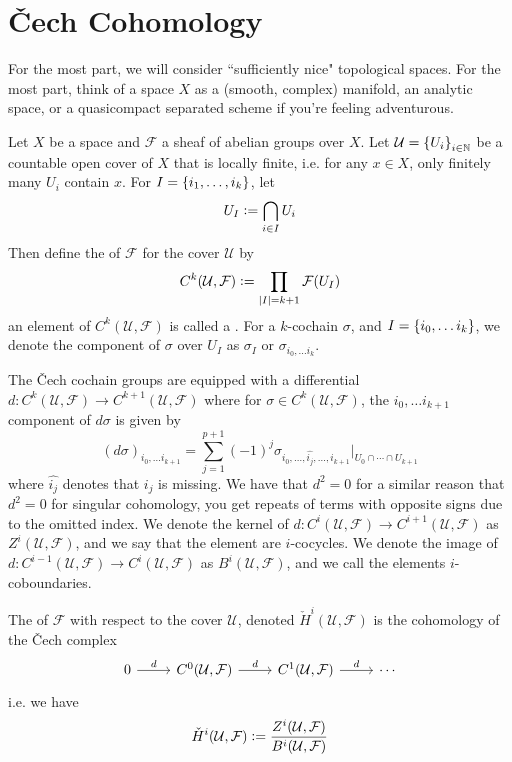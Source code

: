 \section{\v{C}ech Cohomology}
%
For the most part, we will consider ``sufficiently nice" topological spaces.
For the most part, think of a space $X$ as a (smooth, complex) manifold, an analytic
space, or a quasicompact separated scheme if you're feeling adventurous.
%
\begin{defn}
Let $X$ be a space and $\mathcal{F}$ a sheaf of abelian groups over $X$. Let
$\mathcal{U} = \left\lbrace U_i \right\rbrace_{i \in \mathbb{N}}$ be a countable open cover of $X$ that is locally
finite, i.e. for any $x \in X$, only finitely many $U_i$ contain $x$. For
$I = \left\lbrace i_1, \ldots, i_k \right\rbrace$, let
\[
U_I \vcentcolon= \bigcap_{i \in I} U_i
\]
Then define the  of $\mathcal{F}$ for the cover
$\mathcal{U}$ by
\begin{align*}
C^k(\mathcal{U}, \mathcal{F}) \vcentcolon= \prod_{|I| = k+1} \mathcal{F}(U_I)
\end{align*}
an element of $C^k(\mathcal{U},\mathcal{F})$ is called a .
For a $k$-cochain $\sigma$, and $I = \left\lbrace i_0,\ldots i_k \right\rbrace$, we denote the
component of $\sigma$ over $U_I$ as $\sigma_I$ or $\sigma_{i_0,\ldots i_k}$.
\end{defn}
%
The \v{C}ech cochain groups are equipped with a differential
$d : C^k(\mathcal{U}, \mathcal{F}) \to C^{k+1}(\mathcal{U}, \mathcal{F})$
where for $\sigma \in C^k(\mathcal{U}, \mathcal{F})$, the ${i_0, \ldots i_{k+1}}$
component of $d\sigma$ is given by
\[
(d\sigma)_{i_0, \ldots i_{k+1}}
= \sum_{j = 1}^{p+1}(-1)^j\sigma_{i_0, \ldots, \widehat{i_j}, \ldots, i_{k+1}}
\vert_{U_0 \cap \cdots \cap U_{k+1}}
\]
where $\widehat{i_j}$ denotes that $i_j$ is missing. We have that $d^2 = 0$ for a
similar reason that $d^2 = 0$ for singular cohomology, you get repeats of
terms with opposite signs due to the omitted index. We denote the kernel of
$d : C^i(\mathcal{U}, \mathcal{F}) \to C^{i+1}(\mathcal{U}, \mathcal{F})$ as
$Z^i(\mathcal{U}, \mathcal{F})$, and we say that the element are $i$-cocycles.
We denote the image of
$d : C^{i-1}(\mathcal{U}, \mathcal{F}) \to C^i(\mathcal{U}, \mathcal{F})$ as
$B^i(\mathcal{U}, \mathcal{F})$, and we call the elements $i$-coboundaries.
%
\begin{defn}
The  of $\mathcal{F}$ with respect to the cover
$\mathcal{U}$, denoted $\check{H}^i(\mathcal{U}, \mathcal{F})$ is the cohomology of
the \v{C}ech complex
\[\begin{tikzcd}
0 \ar[r, "d"] & C^0(\mathcal{U}, \mathcal{F}) \ar[r, "d"] &
C^1(\mathcal{U}, \mathcal{F}) \ar[r, "d"]
& \cdots
\end{tikzcd}\]
i.e. we have
\[
\check{H}^i(\mathcal{U}, \mathcal{F}) \vcentcolon=
\frac{Z^i(\mathcal{U}, \mathcal{F})}{B^i(\mathcal{U}, \mathcal{F})}
\]
\end{defn}
